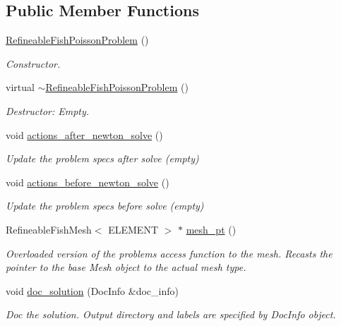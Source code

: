 \subsection*{Public Member Functions}
\begin{DoxyCompactItemize}
\item 
\hyperlink{classRefineableFishPoissonProblem_a7a9c8258a867de6b3c8b9d00a7c965f1}{Refineable\+Fish\+Poisson\+Problem} ()
\begin{DoxyCompactList}\small\item\em Constructor. \end{DoxyCompactList}\item 
virtual \hyperlink{classRefineableFishPoissonProblem_a4a5e7c5f264364211ad641353933c222}{$\sim$\+Refineable\+Fish\+Poisson\+Problem} ()
\begin{DoxyCompactList}\small\item\em Destructor\+: Empty. \end{DoxyCompactList}\item 
void \hyperlink{classRefineableFishPoissonProblem_a7f6c356f7c8bd0130de957297e999f40}{actions\+\_\+after\+\_\+newton\+\_\+solve} ()
\begin{DoxyCompactList}\small\item\em Update the problem specs after solve (empty) \end{DoxyCompactList}\item 
void \hyperlink{classRefineableFishPoissonProblem_a58098181f3b88c2fc65f24fb15c1a529}{actions\+\_\+before\+\_\+newton\+\_\+solve} ()
\begin{DoxyCompactList}\small\item\em Update the problem specs before solve (empty) \end{DoxyCompactList}\item 
Refineable\+Fish\+Mesh$<$ E\+L\+E\+M\+E\+NT $>$ $\ast$ \hyperlink{classRefineableFishPoissonProblem_a803c9050b07b35aba22f08a5a9e59f2c}{mesh\+\_\+pt} ()
\begin{DoxyCompactList}\small\item\em Overloaded version of the problem\textquotesingle{}s access function to the mesh. Recasts the pointer to the base Mesh object to the actual mesh type. \end{DoxyCompactList}\item 
void \hyperlink{classRefineableFishPoissonProblem_aeee1bf23216971b50b8822c45e62c48b}{doc\+\_\+solution} (Doc\+Info \&doc\+\_\+info)
\begin{DoxyCompactList}\small\item\em Doc the solution. Output directory and labels are specified by Doc\+Info object. \end{DoxyCompactList}\item 

\end{DoxyCompactItemize}
